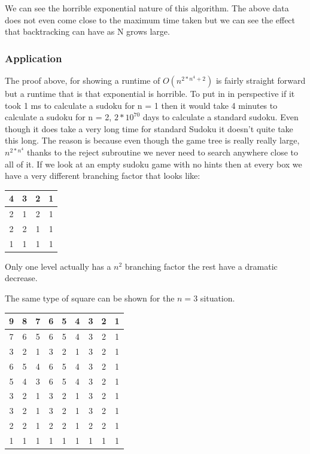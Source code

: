 \documentclass{sig-alternate}
\begin{document}
We can see the horrible exponential nature of this algorithm. The above data does not even come close to the maximum time taken but we can see the effect that backtracking can have as N grows large. 

\subsubsection{Application}
The proof above, for showing a runtime of $O(n^{2*n^4 + 2})$ is fairly straight forward but a runtime that is that exponential is horrible. To put in in perspective if it took 1 ms to calculate a sudoku for n = 1 then it would take 4 minutes to calculate a sudoku for n = 2, $2*10^70$ days to calculate a standard sudoku. Even though it does take a very long time for standard Sudoku it doesn't quite take this long. The reason is because even though the game tree is really really large, $n^{2*n^4}$ thanks to the reject subroutine we never need to search anywhere close to all of it. If we look at an empty sudoku game with no hints then at every box we have a very different branching factor that looks like:

\begin{center}
  \begin{tabular}{ | c | c | c | c | }
    \hline
    	4 & 3 & 2 & 1 \\ \hline
    	2 & 1 & 2 & 1 \\ \hline
    	2 & 2 & 1 & 1 \\ \hline
       	1 & 1 & 1 & 1 \\
    \hline
  \end{tabular}
\end{center}

Only one level actually has a $n^2$ branching factor the rest have a dramatic decrease. 

The same type of square can be shown for the $n = 3$ situation. 

\begin{center}
  \begin{tabular}{ | c | c | c | c | c | c | c | c | c |}
    \hline
    	9 & 8 & 7 & 6 & 5 & 4 & 3 & 2 & 1 \\ \hline
        7 & 6 & 5 & 6 & 5 & 4 & 3 & 2 & 1 \\ \hline
        3 & 2 & 1 & 3 & 2 & 1 & 3 & 2 & 1 \\ \hline
        6 & 5 & 4 & 6 & 5 & 4 & 3 & 2 & 1 \\ \hline
        5 & 4 & 3 & 6 & 5 & 4 & 3 & 2 & 1 \\ \hline
        3 & 2 & 1 & 3 & 2 & 1 & 3 & 2 & 1 \\ \hline
        3 & 2 & 1 & 3 & 2 & 1 & 3 & 2 & 1 \\ \hline
        2 & 2 & 1 & 2 & 2 & 1 & 2 & 2 & 1 \\ \hline
        1 & 1 & 1 & 1 & 1 & 1 & 1 & 1 & 1 \\ 
    \hline
  \end{tabular}
\end{center}
\end{document}

